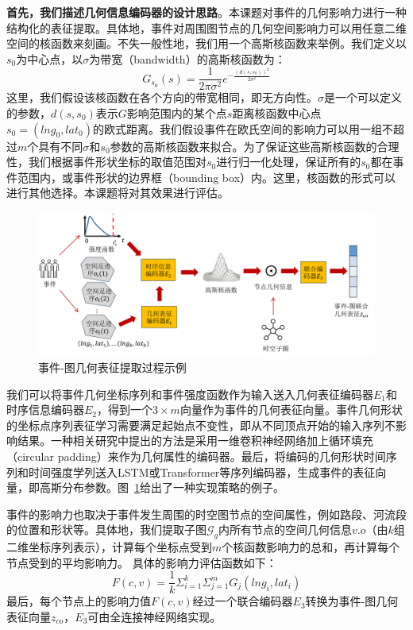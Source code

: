 \documentclass[12pt,UTF8,AutoFakeBold=2,a4paper]{ctexart} %
\begin{document}
\textbf{首先，我们描述几何信息编码器的设计思路}。本课题对事件的几何影响力进行一种结构化的表征提取。具体地，事件对周围图节点的几何空间影响力可以用任意二维空间的核函数来刻画。不失一般性地，我们用一个高斯核函数来举例。我们定义以$s_0$为中心点，以$\sigma$为带宽（bandwidth）的高斯核函数为：
\begin{equation}
    G_{s_0}(s) = \frac{1}{2\pi\sigma^2}e^{-\frac{(d(s,s_0))^2}{2\sigma^2}}
\end{equation}
这里，我们假设该核函数在各个方向的带宽相同，即无方向性。$\sigma$是一个可以定义的参数，$d(s,s_0)$表示$G$影响范围内的某个点$s$距离核函数中心点$s_0 = (lng_0, lat_0)$的欧式距离。我们假设事件在欧氏空间的影响力可以用一组不超过$m$个具有不同$\sigma$和$s_0$参数的高斯核函数来拟合。为了保证这些高斯核函数的合理性，我们根据事件形状坐标的取值范围对$s_0$进行归一化处理，保证所有的$s_0$都在事件范围内，或事件形状的边界框（bounding box）内。这里，核函数的形式可以进行其他选择。本课题将对其效果进行评估。
\begin{figure}
    \centering
\includegraphics[width=0.99\linewidth]{fig/geo-embed.png}
    \caption{事件-图几何表征提取过程示例}
    \label{fig:geom_encode}
\end{figure}
我们可以将事件几何坐标序列和事件强度函数作为输入送入几何表征编码器$E_1$和时序信息编码器$E_2$，得到一个$3\times m$向量作为事件的几何表征向量。事件几何形状的坐标点序列表征学习需要满足起始点不变性，即从不同顶点开始的输入序列不影响结果。一种相关研究中提出的方法是采用一维卷积神经网络加上循环填充（circular padding）来作为几何属性的编码器。最后，将编码的几何形状时间序列和时间强度学列送入LSTM或Transformer等序列编码器，生成事件的表征向量，即高斯分布参数。图~\ref{fig:geom_encode}给出了一种实现策略的例子。

事件的影响力也取决于事件发生周围的时空图节点的空间属性，例如路段、河流段的位置和形状等。具体地，我们提取子图$\mathcal{G}_g$内所有节点的空间几何信息$v.o$（由$k$组二维坐标序列表示），计算每个坐标点受到$m$个核函数影响力的总和，再计算每个节点受到的平均影响力。%
具体的影响力评估函数如下：
\begin{equation}
    F(c, v) = \frac{1}{k}\Sigma^k_{i=1}\Sigma_{j=1}^m G_j(lng_i, lat_i)
\end{equation}
最后，每个节点上的影响力值$F(c, v)$经过一个联合编码器$E_3$转换为事件-图几何表征向量$z_{co}$，$E_3$可由全连接神经网络实现。
\end{document}
